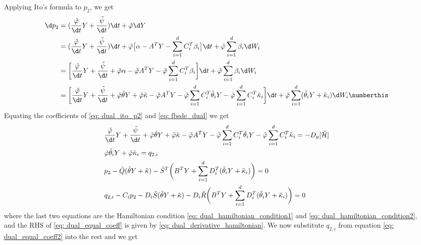 Applying Ito's formula to $p_2$, we get
\begin{align*}
    \d p_2 &= (\frac{\tilde{\varphi}}{\d t} Y + \frac{\tilde{\psi}}{\d t})\d t + \tilde{\varphi} \d Y\\
    &= (\frac{\tilde{\varphi}}{\d t} Y + \frac{\tilde{\psi}}{\d t})\d t + \tilde{\varphi} \big[ \alpha - A^T Y - \sum_{i=1}^d C_i^T \beta_i \big]\d t + \tilde{\varphi} \sum_{i=1}^d \beta_i \d W_i\\
    &= \bigg[ \frac{\tilde{\varphi}}{\d t}Y + \frac{\tilde{\psi}}{\d t} + \tilde{\varphi} \alpha - \tilde{\varphi} A^T Y -\tilde{\varphi} \sum_{i=1}^d C_i^T \beta_i \bigg] \d t + \tilde{\varphi} \sum_{i=1}^d \beta_i \d W_i\\
    &= \bigg[ \frac{\tilde{\varphi}}{\d t}Y + \frac{\tilde{\psi}}{\d t} + \tilde{\varphi} \tilde{\theta} Y + \tilde{\varphi} \tilde{\kappa} - \tilde{\varphi} A^T Y - \tilde{\varphi} \sum_{i=1}^d C_i^T \tilde{\theta}_i Y - \tilde{\varphi} \sum_{i=1}^d C_i^T \tilde{\kappa}_i \bigg] \d t + \tilde{\varphi} \sum_{i=1}^d (\tilde{\theta}_i Y + \tilde{\kappa}_i) \d W_i \numberthis 
    \label{eq: dual_ito_p2}
\end{align*}
Equating the coefficients of \eqref{eq: dual_ito_p2} and \eqref{eq: fbsde_dual} we get 
\begin{align}
    &\frac{\tilde{\varphi}}{\d t}Y + \frac{\tilde{\psi}}{\d t} + \tilde{\varphi} \tilde{\theta} Y + \tilde{\varphi} \tilde{\kappa} - \tilde{\varphi} A^T Y - \tilde{\varphi} \sum_{i=1}^d C_i^T \tilde{\theta}_i Y - \tilde{\varphi} \sum_{i=1}^d C_i^T \tilde{\kappa}_i = -D_y[\tilde{\mathcal{H}}] \label{eq: dual_equal_coeff}\\
    &\tilde{\varphi} \tilde{\theta}_i Y + \tilde{\varphi} \tilde{\kappa}_i = q_{2, i} \label{eq: dual_equal_coeff2}\\
    &p_2 - \tilde{Q}(\tilde{\theta} Y + \tilde{\kappa}) - \tilde{S}^T \bigg(B^T Y + \sum_{i=1}^d D_i^T (\tilde{\theta}_i Y + \tilde{\kappa}_i)\bigg)= 0\\
    &q_{2,i} - C_i p_2 - D_i \tilde{S}(\tilde{\theta} Y + \tilde{\kappa}) - D_i \tilde{R}\bigg(B^T Y + \sum_{i=1}^d D_i^T (\tilde{\theta}_iY + \tilde{\kappa}_i)\bigg) = 0
\end{align}
where the last two equations are the Hamiltonian condition \eqref{eq: dual_hamiltonian_condition1} and \eqref{eq: dual_hamiltonian_condition2}, and the RHS of \eqref{eq: dual_equal_coeff} is given by \eqref{eq: dual_derivative_hamiltonian}. We now substitute $q_{2,i}$ from equation \eqref{eq: dual_equal_coeff2} into the rest and we get
